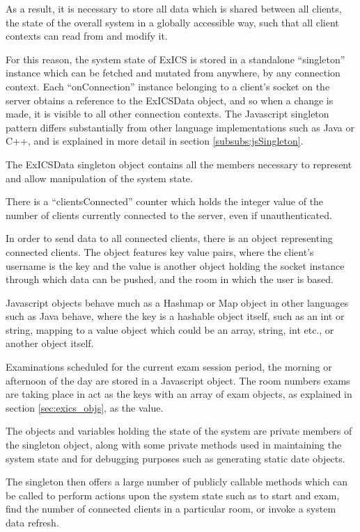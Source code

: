 As a result, it is necessary to store all data which is shared between all clients, the state of the overall system in a globally accessible way, such that all client contexts can read from and modify it.

For this reason, the system state of ExICS is stored in a standalone ``singleton'' instance which can be fetched and mutated from anywhere, by any connection context.  Each ``onConnection'' instance belonging to a client's socket on the server obtains a reference to the ExICSData object, and so when a change is made, it is visible to all other connection contexts.  The Javascript singleton pattern differs substantially from other language implementations such as Java or C++, and is explained in more detail in section \ref{subsubs:jsSingleton}.

The ExICSData singleton object contains all the members necessary to represent and allow manipulation of the system state.

There is a ``clientsConnected'' counter which holds the integer value of the number of clients currently connected to the server, even if unauthenticated.

In order to send data to all connected clients, there is an object representing connected clients.  The object features key value pairs, where the client's username is the key and the value is another object holding the socket instance through which data can be pushed, and the room in which the user is based.

Javascript objects behave much as a Hashmap or Map object in other languages such as Java behave, where the key is a hashable object itself, such as an int or string, mapping to a value object which could be an array, string, int etc., or another object itself.

Examinations scheduled for the current exam session period, the morning or afternoon of the day are stored in a Javascript object.  The room numbers exams are taking place in act as the keys with an array of exam objects, as explained in section \ref{sec:exics_objs}, as the value.

The objects and variables holding the state of the system are private members of the singleton object, along with some private methods used in maintaining the system state and for debugging purposes such as generating static date objects.

The singleton then offers a large number of publicly callable methods which can be called to perform actions upon the system state such as to start and exam, find the number of connected clients in a particular room, or invoke a system data refresh.

